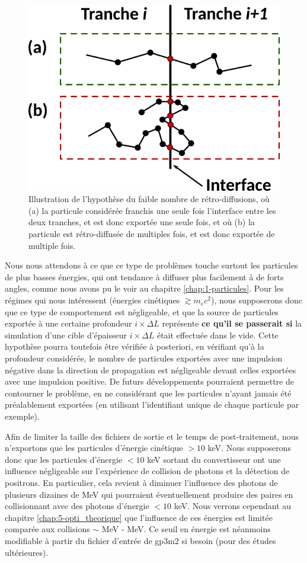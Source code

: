 \begin{refsection}
\begin{figure}[hbtp]
	\centering
	\includegraphics[width=0.6\linewidth]{4-simulation/multi-layer_hypothesis.png}
	\caption{Illustration de l'hypothèse du faible nombre de rétro-diffusions, où (a) la particule considérée franchis une seule fois l'interface entre les deux tranches, et est donc exportée une seule fois, et où (b) la particule est rétro-diffusée de multiples fois, et est donc exportée de multiple fois.}
	\label{fig:4-MC_hypothese_multicouches}
\end{figure}

Nous nous attendons à ce que ce type de problèmes touche surtout les particules de plus basses énergies, qui ont tendance à diffuser plus facilement à de forts angles, comme nous avons pu le voir au chapitre \ref{chap:1-particules}. Pour les régimes qui nous intéressent (énergies cinétiques $\gtrsim m_e c^2$), nous supposerons donc que ce type de comportement est négligeable, et que la source de particules exportée à une certaine profondeur $i \times \Delta L$ représente \textbf{ce qu'il se passerait si} la simulation d'une cible d'épaisseur $i \times \Delta L$ était effectuée dans le vide. Cette hypothèse pourra toutefois être vérifiée à posteriori, en vérifiant qu'à la profondeur considérée, le nombre de particules exportées avec une impulsion négative dans la direction de propagation est négligeable devant celles exportées avec une impulsion positive. De futurs développements pourraient permettre de contourner le problème, en ne considérant que les particules n'ayant jamais été préalablement exportées (en utilisant l'identifiant unique de chaque particule par exemple).


Afin de limiter la taille des fichiers de sortie et le temps de post-traitement, nous n'exportons que les particules d'énergie cinétique $> 10 $ keV. Nous supposerons donc que les particules d'énergie $<10$ keV sortant du convertisseur ont une influence négligeable sur l'expérience de collision de photons et la détection de positrons. En particulier, cela revient à diminuer l'influence des photons de plusieurs dizaines de MeV qui pourraient éventuellement produire des paires en collisionnant avec des photons d'énergie $<10$ keV. Nous verrons cependant au chapitre \ref{chap:5-opti_theorique} que l'influence de ces énergies est limitée comparée aux collisions $\sim$ MeV - MeV. Ce seuil en énergie est néanmoins modifiable à partir du fichier d'entrée de gp3m2 si besoin (pour des études ultérieures).



\end{refsection}
